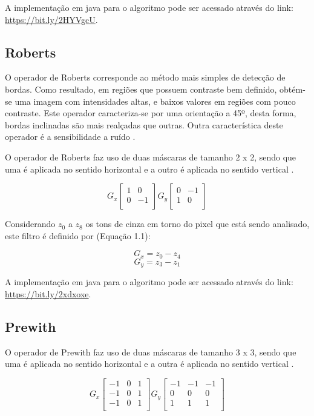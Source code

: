 \documentclass[
	12pt,				%
	oneside,			%
	a4paper,			%
	english,			%
	french,				%
	spanish,			%
	brazil,				%
	]{abntex2}
\begin{document}
A implementação em java para o algoritmo pode ser acessado através do link: \url{https://bit.ly/2HYVgcU}.

\subsection{Roberts}
O operador de Roberts corresponde ao método mais simples de detecção de bordas. Como resultado, em regiões que possuem contraste bem definido, obtém-se uma imagem com intensidades altas, e baixos valores em regiões com pouco contraste. Este operador caracteriza-se por uma orientação a 45º, desta forma, bordas inclinadas são mais realçadas que outras. Outra característica deste operador é a sensibilidade a ruído \cite{conciAzevedoLeta:2008}.

O operador de Roberts faz uso de duas máscaras de tamanho 2 x 2, sendo que uma é aplicada no sentido horizontal e a outro é aplicada no sentido vertical \cite{pedriniSchwartz:2008}.


\[
G_x
\begin{bmatrix}
    1 &  0    \\ 
	0 & -1    \\    
\end{bmatrix} 
G_y
\begin{bmatrix}
    0 & -1   \\ 
	1 &  0   \\    
\end{bmatrix} 
\]

Considerando \(z_0\) a \(z_8\) os tons de cinza em torno do pixel que está sendo analisado, este filtro é definido por (Equação 1.1):

\[G_x = z_0 - z_4\]
\[G_y = z_3 -z_1\]

A implementação em java para o algoritmo pode ser acessado através do link: \url{https://bit.ly/2xdxoxe}.
\subsection{Prewith}

O operador de Prewith faz uso de duas máscaras de tamanho 3 x 3, sendo que uma é aplicada no sentido horizontal e a outra é aplicada no sentido vertical \cite{pedriniSchwartz:2008}.	

\[
G_x
\begin{bmatrix}
    -1 & 0 & 1   \\ 
	-1 & 0 & 1   \\ 
	-1 & 0 & 1   \\    
\end{bmatrix} 
G_y
\begin{bmatrix}
    -1 & -1 & -1   \\ 
	 0 &  0 &  0   \\ 
	 1 &  1 &  1   \\    
\end{bmatrix} 
\]
\end{document}
